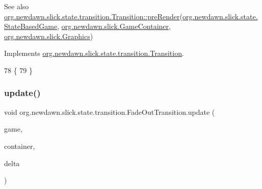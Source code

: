 \begin{DoxySeeAlso}{See also}
\mbox{\hyperlink{interfaceorg_1_1newdawn_1_1slick_1_1state_1_1transition_1_1_transition_ab8b0668c059830d938575d1a0b08bd93}{org.\+newdawn.\+slick.\+state.\+transition.\+Transition\+::pre\+Render}}(\mbox{\hyperlink{classorg_1_1newdawn_1_1slick_1_1state_1_1_state_based_game}{org.\+newdawn.\+slick.\+state.\+State\+Based\+Game}}, \mbox{\hyperlink{classorg_1_1newdawn_1_1slick_1_1_game_container}{org.\+newdawn.\+slick.\+Game\+Container}}, \mbox{\hyperlink{classorg_1_1newdawn_1_1slick_1_1_graphics}{org.\+newdawn.\+slick.\+Graphics}}) 
\end{DoxySeeAlso}


Implements \mbox{\hyperlink{interfaceorg_1_1newdawn_1_1slick_1_1state_1_1transition_1_1_transition_ab8b0668c059830d938575d1a0b08bd93}{org.\+newdawn.\+slick.\+state.\+transition.\+Transition}}.


\begin{DoxyCode}
78                                                                                     \{
79     \}
\end{DoxyCode}
\mbox{\label{classorg_1_1newdawn_1_1slick_1_1state_1_1transition_1_1_fade_out_transition_a0005911f18fd8a8442cda0fdd92f1e1b}} 
\subsubsection{\texorpdfstring{update()}{update()}}
{\footnotesize\ttfamily void org.\+newdawn.\+slick.\+state.\+transition.\+Fade\+Out\+Transition.\+update (\begin{DoxyParamCaption}\item[{\mbox{\hyperlink{classorg_1_1newdawn_1_1slick_1_1state_1_1_state_based_game}{State\+Based\+Game}}}]{game,  }\item[{\mbox{\hyperlink{classorg_1_1newdawn_1_1slick_1_1_game_container}{Game\+Container}}}]{container,  }\item[{int}]{delta }\end{DoxyParamCaption})\hspace{0.3cm}{\ttfamily [inline]}}

